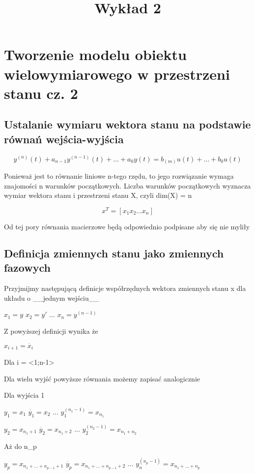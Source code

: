 \documentclass{article}
\title{Wykład 2}
\begin{document}
	\section{Tworzenie modelu obiektu wielowymiarowego w przestrzeni stanu cz. 2}
	\subsection{Ustalanie wymiaru wektora stanu na podstawie równań wejścia-wyjścia}

		\begin{equation}
			y^{(n)}(t) + a_{n-1} y^{(n-1)}(t) + ... +   a_{0} y(t) = b_{(m)} u(t) + ... + b_{0} u(t)
		\end{equation}

		Ponieważ jest to równanie liniowe n-tego rzędu, to jego rozwiązanie wymaga znajomości
		n warunków początkowych. Liczba warunków początkowych wyznacza wymiar wektora stanu
		i przestrzeni stanu X, czyli dim(X) = n

		\begin{equation}
			x^{T} = [ x_{1} x_{2} ... x_{n} ]
		\end{equation}

		Od tej pory równania macierzowe będą odpowiednio podpisane aby się nie myliły

	\subsection{Definicja zmiennych stanu jako zmiennych fazowych}

		Przyjmijmy następującą definicje współrzędnych wektora zmiennych stanu x
		dla układu o __jednym wejściu__

		$ x_{1} = y $
		$ x_{2} = y'$
		...
		$ x_{n} = y^{(n-1)}$

		Z powyższej definicji wynika że

		$ x_{i+1} = \dot{x_{i}} $

		Dla i = <1;n-1>

		Dla wielu wyjść powyższe równania możemy zapisać analogicznie

		Dla wyjścia 1

		$ y_{1} = x_{1} $
		$ \dot{y_{1}} = x_{2} $
		...
		$ y_{1}^{(n_{1}-1)} = x_{n_{1}} $

		$ y_{2} = x_{n_{1}+1} $
		$ \dot{y_{2}} = x_{n_{1}+2} $
		...
		$ y_{2}^{(n_{2}-1)} = x_{n_{1}+n_{2}} $

		Aż do n_{p}

		$ y_{p} = x_{n_{1}+...+n_{p-1} + 1} $
		$ \dot{y_{p}} = x_{n_{1}+...+n_{p-1} + 2} $
		...
		$ y_{n}^{(n_{p}-1)} = x_{n_{1}+...+n_{p}} $
\end{document}
